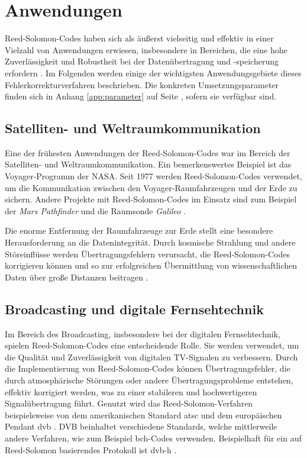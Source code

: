 \chapter{Anwendungen}\label{ch:application}

Reed-Solomon-Codes haben sich als äußerst vielseitig und effektiv in einer Vielzahl von Anwendungen erwiesen, insbesondere in Bereichen, die eine hohe Zuverlässigkeit und Robustheit bei der Datenübertragung und -speicherung erfordern \cite{WasIstReedSolomonVerfahren2022}. 
Im Folgenden werden einige der wichtigsten Anwendungsgebiete dieses Fehlerkorrekturverfahren beschrieben.
Die konkreten Umsetzungsparameter finden sich in Anhang \ref{app:parameter} auf Seite \pageref{app:parameter}, sofern sie verfügbar sind.

\section{Satelliten- und Weltraumkommunikation}

Eine der frühesten Anwendungen der Reed-Solomon-Codes war im Bereich der Satelliten- und Weltraumkommunikation. 
Ein bemerkenswertes Beispiel ist das Voyager-Programm der \mbox{NASA}. Seit 1977 werden Reed-Solomon-Codes verwendet, um die Kommunikation zwischen den Voyager-Raumfahrzeugen und der Erde zu sichern. 
Andere Projekte mit Reed-Solomon-Codes im Einsatz sind zum Beispiel der \textit{Mars Pathfinder} und die Raumsonde \textit{Galileo} \cite[Kapitel 3]{wickerReedSolomonCodes1994}.

Die enorme Entfernung der Raumfahrzeuge zur Erde stellt eine besondere Herausforderung an die Datenintegrität. 
Durch kosmische Strahlung und andere Störeinflüsse werden Übertragungsfehlern verursacht, die Reed-Solomon-Codes korrigieren können und  so zur erfolgreichen Übermittlung von wissenschaftlichen Daten über große Distanzen beitragen \cite[Kapitel 5]{ludwigVoyagerTelecommunications2002}.

\section{Broadcasting und digitale Fernsehtechnik}

Im Bereich des Broadcasting, insbesondere bei der digitalen Fernsehtechnik, spielen Reed-Solomon-Codes eine entscheidende Rolle. 
Sie werden verwendet, um die Qualität und Zuverlässigkeit von digitalen TV-Signalen zu verbessern. 
Durch die Implementierung von Reed-Solomon-Codes können Übertragungsfehler, die durch atmosphärische Störungen oder andere Übertragungsprobleme entstehen, effektiv korrigiert werden, was zu einer stabileren und hochwertigeren Signalübertragung führt.
Genutzt wird das Reed-Solomon-Verfahren beispielsweise von dem amerikanischen Standard \acrfull{atsc} und dem europäischen Pendant \acrfull{dvb} \cite{ilievAnalysisEvaluationReedSolomon2008}.
DVB beinhaltet verschiedene Standards, welche mittlerweile andere Verfahren, wie zum Beispiel \acrshort{bch}-Codes verwenden. 
Beispielhaft für ein auf Reed-Solomon basierendes Protokoll ist \acrshort{dvb-h} \cite{DVBH2024}. 

